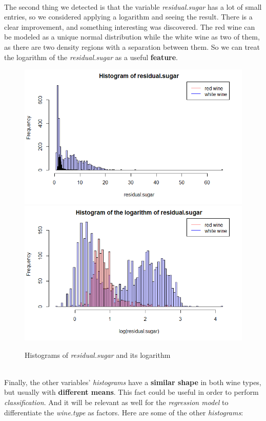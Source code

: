 \documentclass[10pt]{article}
\begin{document}
\ \\
The second thing we detected is that the variable \textit{residual.sugar} has a lot of small entries, so we considered applying a logarithm and seeing the result. There is a clear improvement, and something interesting was discovered. The red wine can be modeled as a unique normal distribution while the white wine as two of them, as there are two density regions with a separation between them. So we can treat the logarithm of the \textit{residual.sugar} as a useful \textbf{feature}.
\begin{figure}[H]
\centering
\caption{Histograms of \textit{residual.sugar} and its logarithm}
\includegraphics[scale=0.4]{histogram_of_residualsugar}
\includegraphics[scale=0.4]{histogram_of_log_residualsugar}
\end{figure}
\ \\
Finally, the other variables' \textit{histograms} have a \textbf{similar shape} in both wine types, but usually with \textbf{different means}. This fact could be useful in order to perform \textit{classification}. And it will be relevant as well for the \textit{regression model} to differentiate the \textit{wine.type} as factors. Here are some of the other \textit{histograms}: \\
\end{document}
